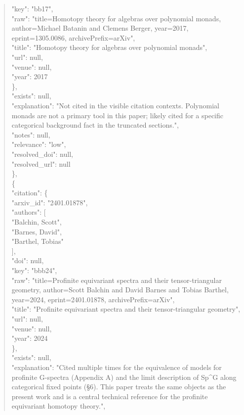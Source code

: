 \documentclass[11pt]{article}
\begin{document}
\begin{quote}
        "key": "bb17",\\
        "raw": "title=Homotopy theory for algebras over polynomial monads, author=Michael Batanin and Clemens Berger, year=2017, eprint=1305.0086, archivePrefix=arXiv",\\
        "title": "Homotopy theory for algebras over polynomial monads",\\
        "url": null,\\
        "venue": null,\\
        "year": 2017\\
      \},\\
      "exists": null,\\
      "explanation": "Not cited in the visible citation contexts. Polynomial monads are not a primary tool in this paper; likely cited for a specific categorical background fact in the truncated sections.",\\
      "notes": null,\\
      "relevance": "low",\\
      "resolved\_doi": null,\\
      "resolved\_url": null\\
    \},\\
    \{\\
      "citation": \{\\
        "arxiv\_id": "2401.01878",\\
        "authors": [\\
          "Balchin, Scott",\\
          "Barnes, David",\\
          "Barthel, Tobias"\\
        ],\\
        "doi": null,\\
        "key": "bbb24",\\
        "raw": "title=Profinite equivariant spectra and their tensor-triangular geometry, author=Scott Balchin and David Barnes and Tobias Barthel, year=2024, eprint=2401.01878, archivePrefix=arXiv",\\
        "title": "Profinite equivariant spectra and their tensor-triangular geometry",\\
        "url": null,\\
        "venue": null,\\
        "year": 2024\\
      \},\\
      "exists": null,\\
      "explanation": "Cited multiple times for the equivalence of models for profinite G-spectra (Appendix A) and the limit description of Sp\^{}G along categorical fixed points (§6). This paper treats the same objects as the present work and is a central technical reference for the profinite equivariant homotopy theory.",\\

\end{quote}
\end{document}
